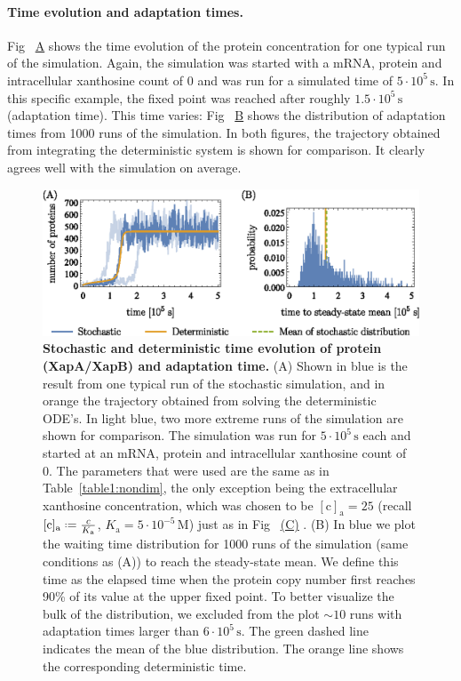 \documentclass[10pt,letterpaper]{article}
\newcommand{\unit}[1]{\,\mathrm{#1}}
\newcommand{\n}[1]{\mathrm{#1}}
\newcommand*{\defeq}{\mathrel{\vcenter{\baselineskip0.5ex \lineskiplimit0pt
			\hbox{\scriptsize.}\hbox{\scriptsize.}}}%
	=}
\newcommand\subref[2]{%
	\def\myref{\getrefnumber{#1}}%
	\hyperref[#1]{\myref\mbox{#2}}%
}
\begin{document}
	\paragraph*{Time evolution and adaptation times.}
	Fig~\subref{fig9:StochT}{A} shows the time evolution of the protein concentration for one typical run of the simulation.
	Again, the simulation was started with a mRNA, protein and intracellular
	xanthosine count of 0 and was run for a simulated time of $5 \cdot 10^5
	\unit{s}$. In this specific example, the fixed point was reached after roughly $1.5 \cdot 10^5
	\unit{s}$ (adaptation time).
	This time varies: Fig~\subref{fig9:StochT}{B} shows the distribution
	of adaptation times from 1000 runs of the simulation.
	In both figures, the trajectory obtained from
	integrating the deterministic system is shown for comparison. It
	clearly agrees well with the simulation on average.
	
	\begin{figure}%
		\centering
		\includegraphics{media/Fig9_evolution.eps}
		\caption{{\bf Stochastic and deterministic time evolution of protein (XapA/XapB) and adaptation time.}
			(A) Shown in blue is the result from one typical run of the stochastic simulation, and in orange the trajectory obtained from solving the deterministic ODE's. In light blue, two more extreme runs of the simulation are shown for comparison. The simulation was run for $5 \cdot 10^5 \unit{s}$ each and started
			at an mRNA, protein and intracellular xanthosine count of 0. The parameters that were used are the same as in
			Table~\ref{table1:nondim}, the only exception being the
			extracellular xanthosine concentration, which was chosen to be
			$\n{[c]_a} = 25$ (recall $\n{[c]_{a}} \defeq \frac{c}{K_{\n{a}}}$,
			$K_{\n{a}} = 5 \cdot 10^{-5} \unit{M}$) just as in
			Fig~\subref{fig8:stochC}{(C)}.
			(B) In blue we plot the waiting time distribution for 1000
			runs of the simulation (same conditions as (A)) to reach
			the steady-state mean.
			We define this time as the elapsed time when the protein
			copy number first reaches 90\% of its value at the upper
			fixed point.
			To better visualize the bulk of the distribution, we
			excluded from the plot $\sim10$ runs with adaptation times
			larger than $6 \cdot 10^5 \unit{s}$.
			The green dashed line indicates the mean of the blue distribution.
			The orange line shows the corresponding deterministic time.
			}
		\label{fig9:StochT}
	\end{figure}
	
\end{document}
